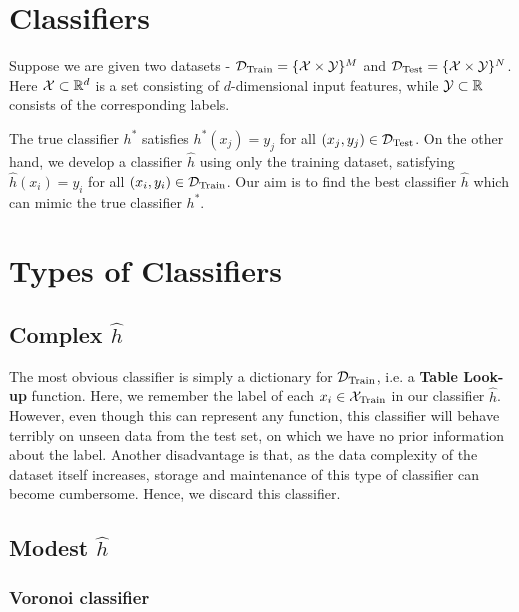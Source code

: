 \documentclass[12pt]{article}
\begin{document}
	\MakeScribeTop


\section{Classifiers}
Suppose we are given two datasets - ${\cal D}_{\textrm{Train}} = \{{\cal X} \times {\cal Y}\}^M$ and ${\cal D}_{\textrm{Test}} = \{{\cal X} \times {\cal Y}\}^N$. Here ${\cal X} \subset \mathbb R^d$ is a set consisting of $d$-dimensional input features, while ${\cal Y} \subset \mathbb R$ consists of the corresponding labels.

The true classifier $h^*$ satisfies $h^*(x_j) = y_j$ for all $(x_j, y_j) \in {\cal D}_{\textrm{Test}}$. On the other hand, we develop a classifier $\widehat{h}$ using only the training dataset, satisfying $\widehat{h}(x_i) = y_i$ for all $(x_i, y_i) \in {\cal D}_{\textrm{Train}}$. Our aim is to find the best classifier $\widehat{h}$ which can mimic the true classifier $h^*$.

\section{Types of Classifiers}
\subsection{Complex $\widehat{h}$}
The most obvious classifier is simply a dictionary for ${\cal D}_{\textrm{Train}}$, i.e. a {\bf Table Look-up} function. Here, we remember the label of each $x_i \in {\cal X}_{\textrm{Train}}$ in our classifier $\widehat{h}$.  However, even though this can represent any function, this classifier will behave terribly on unseen data from the test set, on which we have no prior information about the label. Another disadvantage is that, as the data complexity of the dataset itself increases, storage and maintenance of this type of classifier can become cumbersome. Hence, we discard this classifier.

\subsection{Modest $\widehat{h}$}

\subsubsection{Voronoi classifier}
\end{document}
